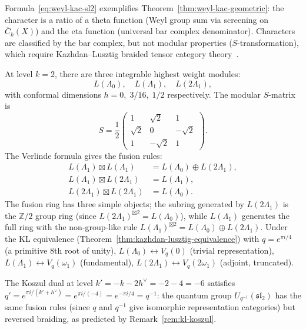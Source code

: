 \begin{remark}
\label{rem:geometric-theta-eta}
Formula~\eqref{eq:weyl-kac-sl2} exemplifies Theorem~\ref{thm:weyl-kac-geometric}: the character is a ratio of a theta function (Weyl group sum via screening on $\overline{C}_k(X)$) and the eta function (universal bar complex denominator). Characters are classified by the bar complex, but not modular properties ($S$-transformation), which require Kazhdan--Lusztig braided tensor category theory~\cite{KL93}.
\end{remark}

\begin{example}
\label{ex:sl2-level2}
At level $k = 2$, there are three integrable highest weight modules:
\[
L(\Lambda_0),\quad L(\Lambda_1),\quad L(2\Lambda_1),
\]
with conformal dimensions $h = 0,\; 3/16,\; 1/2$ respectively.
The modular $S$-matrix is
\begin{equation}\label{eq:s-matrix-sl2-level2}
S = \frac{1}{2}\begin{pmatrix}
1 & \sqrt{2} & 1 \\
\sqrt{2} & 0 & -\sqrt{2} \\
1 & -\sqrt{2} & 1
\end{pmatrix}.
\end{equation}
The Verlinde formula gives the fusion rules:
\begin{align}
L(\Lambda_1) \boxtimes L(\Lambda_1)
&= L(\Lambda_0) \oplus L(2\Lambda_1), \\
L(\Lambda_1) \boxtimes L(2\Lambda_1)
&= L(\Lambda_1), \\
L(2\Lambda_1) \boxtimes L(2\Lambda_1) &= L(\Lambda_0).
\end{align}
The fusion ring has three simple objects; the subring generated by
$L(2\Lambda_1)$ is the $\mathbb{Z}/2$ group ring (since
$L(2\Lambda_1)^{\boxtimes 2} = L(\Lambda_0)$), while $L(\Lambda_1)$
generates the full ring with the non-group-like rule
$L(\Lambda_1)^{\boxtimes 2} = L(\Lambda_0) \oplus L(2\Lambda_1)$.
Under the KL equivalence
(Theorem~\ref{thm:kazhdan-lusztig-equivalence}) with
$q = e^{\pi i/4}$ (a primitive $8$th root of unity),
$L(\Lambda_0) \leftrightarrow V_q(0)$ (trivial representation),
$L(\Lambda_1) \leftrightarrow V_q(\omega_1)$ (fundamental),
$L(2\Lambda_1) \leftrightarrow V_q(2\omega_1)$ (adjoint,
truncated).

The Koszul dual at level $k' = -k - 2h^\vee = -2 - 4 = -6$ satisfies
$q' = e^{\pi i/(k'+h^\vee)} = e^{\pi i/(-4)} = e^{-\pi i/4} = q^{-1}$: the quantum group
$U_{q^{-1}}(\mathfrak{sl}_2)$ has the same fusion rules
(since $q$ and $q^{-1}$ give isomorphic representation categories)
but reversed braiding, as predicted by
Remark~\ref{rem:kl-koszul}.
\end{example}


